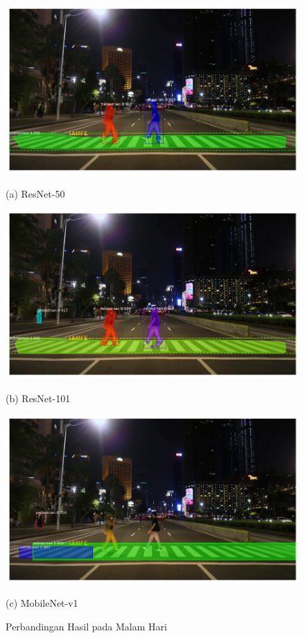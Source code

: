 \begin{figure}[!h]
	\centering
	\begin{minipage}[b]{0.3\textwidth}
		\includegraphics[width=\textwidth]{gambar/malam-frame180-resnet50.png}
		\caption*{(a) ResNet-50}
	\end{minipage}
	\hfill
	\begin{minipage}[b]{0.3\textwidth}
		\includegraphics[width=\textwidth]{gambar/malam-frame180-resnet101.png}
		\caption*{(b) ResNet-101}
	\end{minipage}
	\hfill
	\begin{minipage}[b]{0.3\textwidth}
		\includegraphics[width=\textwidth]{gambar/malam-frame180-mobilnetv1.png}
		\caption*{(c) MobileNet-v1}
	\end{minipage}
	\caption{{Perbandingan Hasil pada Malam Hari}}
	\label{fig:comparasion-night}
\end{figure}

